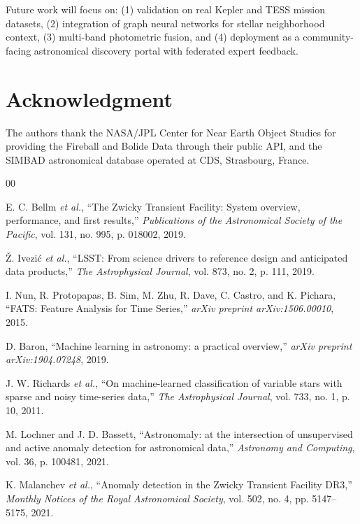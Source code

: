 \documentclass[conference]{IEEEtran}
\begin{document}
Future work will focus on: (1) validation on real Kepler and TESS mission datasets, (2) integration of graph neural networks for stellar neighborhood context, (3) multi-band photometric fusion, and (4) deployment as a community-facing astronomical discovery portal with federated expert feedback.

\section*{Acknowledgment}

The authors thank the NASA/JPL Center for Near Earth Object Studies for providing the Fireball and Bolide Data through their public API, and the SIMBAD astronomical database operated at CDS, Strasbourg, France.

\begin{thebibliography}{00}

E. C. Bellm \textit{et al.}, ``The Zwicky Transient Facility: System overview, performance, and first results,'' \textit{Publications of the Astronomical Society of the Pacific}, vol. 131, no. 995, p. 018002, 2019.

\v{Z}. Ivezi\'{c} \textit{et al.}, ``LSST: From science drivers to reference design and anticipated data products,'' \textit{The Astrophysical Journal}, vol. 873, no. 2, p. 111, 2019.

I. Nun, R. Protopapas, B. Sim, M. Zhu, R. Dave, C. Castro, and K. Pichara, ``FATS: Feature Analysis for Time Series,'' \textit{arXiv preprint arXiv:1506.00010}, 2015.

D. Baron, ``Machine learning in astronomy: a practical overview,'' \textit{arXiv preprint arXiv:1904.07248}, 2019.

J. W. Richards \textit{et al.}, ``On machine-learned classification of variable stars with sparse and noisy time-series data,'' \textit{The Astrophysical Journal}, vol. 733, no. 1, p. 10, 2011.

M. Lochner and J. D. Bassett, ``Astronomaly: at the intersection of unsupervised and active anomaly detection for astronomical data,'' \textit{Astronomy and Computing}, vol. 36, p. 100481, 2021.

K. Malanchev \textit{et al.}, ``Anomaly detection in the Zwicky Transient Facility DR3,'' \textit{Monthly Notices of the Royal Astronomical Society}, vol. 502, no. 4, pp. 5147--5175, 2021.


\end{thebibliography}
\end{document}
